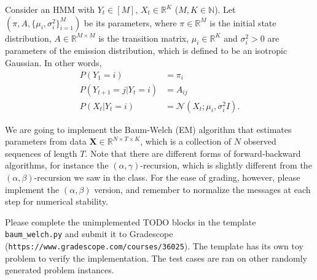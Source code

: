 \documentclass[12pt]{article}
\newcommand{\Ncal}{\mathcal{N}}
\begin{document}
\begin{figure}[h]
\centering
{}
\end{figure}

Consider an HMM with $ Y_t \in [M] $, $ X_t \in \mathbb{R}^{K} $ ($ M, K \in \mathbb{N} $).
Let $ (\pi, A, \{\mu_i, \sigma_i^2\}_{i=1}^M) $ be its parameters, where $ \pi \in \mathbb{R}^{M} $ is the initial state distribution, $ A \in \mathbb{R}^{M \times M} $ is the transition matrix, $ \mu_i \in \mathbb{R}^{K} $ and $ \sigma_i^2 > 0 $ are parameters of the emission distribution, which is defined to be an isotropic Gaussian. 
In other words,
\begin{align}
P(Y_1 = i) & = \pi_{i} \\
P(Y_{t+1} = j | Y_t = i) & = A_{ij} \\
P(X_t | Y_t = i) & = \Ncal(X_t; \mu_i, \sigma_i^2 I).
\end{align}


We are going to implement the Baum-Welch (EM) algorithm that estimates parameters from data $ \boldsymbol{X} \in \mathbb{R}^{N \times T \times K} $, which is a collection of $ N $ observed sequences of length $ T $. 
Note that there are different forms of forward-backward algorithms, for instance the $ (\alpha,\gamma) $-recursion, which is slightly different from the $ (\alpha,\beta)$-recursion we saw in the class. 
For the ease of grading, however, please implement the $ (\alpha,\beta) $ version, and remember to normalize the messages at each step for numerical stability.


Please complete the unimplemented TODO blocks in the template \verb|baum_welch.py| and submit it to Gradescope (\verb|https://www.gradescope.com/courses/36025|).
The template has its own toy problem to verify the implementation. 
The test cases are ran on other randomly generated problem instances.



\newpage


\end{document}
